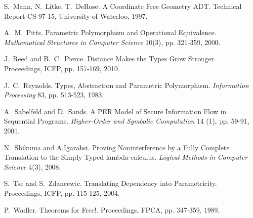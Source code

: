 \documentclass{sigplanconf}
\theoremstyle{examplestyle}
\theoremstyle{restatementstyle}
\begin{document}
\begin{thebibliography}{12}
S.~Mann, N.~Litke, T.~DeRose.  A Coordinate Free Geometry {ADT}.
Technical Report CS-97-15, University of Waterloo, 1997.

A.~M.~Pitts.  Parametric Polymorphism and Operational Equivalence.
{\em Mathematical Structures in Computer Science} 10(3), pp. 321-359,
2000.

J.~Reed and B.~C.~Pierce.  Distance Makes the Types Grow Stronger.
Proceedings, ICFP, pp. 157-169, 2010.

J.~C.~Reynolds. Types, Abstraction and Parametric Polymorphism.
{\em Information Processing} 83, pp. 513-523, 1983.

A.~Sabelfeld and D.~Sands.  A PER Model of Secure Information Flow in
Sequential Programs.  {\em Higher-Order and Symbolic Computation} 14
(1), pp. 59-91, 2001.

N.~Shikuma and A.Igarahsi.  Proving Noninterference by a Fully
Complete Translation to the Simply Typed lambda-calculus.  {\em
    Logical Methods in Computer Science} 4(3), 2008.

S.~Tse and S.~Zdancewic.  Translating Dependency into Parametricity.
Proceedings, ICFP,  pp.
115-125, 2004.

P.~Wadler.  Theorems for Free!.  Proceedings, FPCA,
pp. 347-359, 1989.

\end{thebibliography}

%
%


% 
\end{document}
